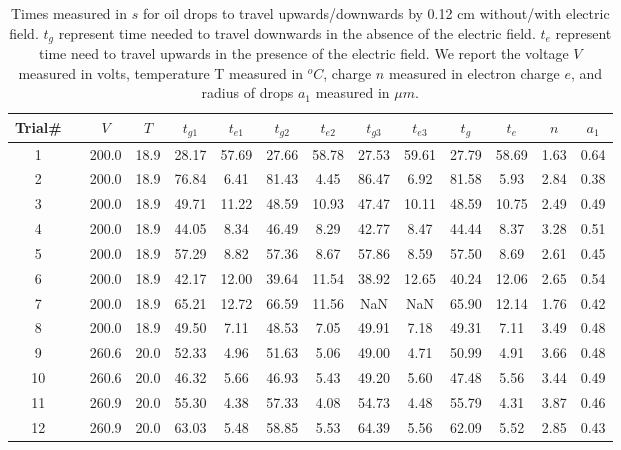 \documentclass{article}
\begin{document}
\begin{table}
\caption{Times measured in $s$ for oil drops to travel upwards/downwards by 0.12 cm without/with electric field. $t_g$ represent time needed to travel downwards in the absence of the electric field. $t_e$ represent time need to travel upwards in the presence of the electric field. We report the voltage $V$ measured in volts, temperature T measured in $^o C$, charge $n$ measured in electron charge $e$, and radius of drops $a_1$ measured in $\mu m$.
}
\vspace{2mm}
\centering %
\begin{tabular}{c c c c c c c c c c c c c c} %
\hline\hline %
Trial\# & \vline & $V$ & $T$ & $t_{g1}$ & $t_{e1}$ & $t_{g2}$ & $t_{e2}$ & $t_{g3}$ & $t_{e3}$ & $t_{g}$ & $t_{e}$ & $n$ & $a_1$\\ [0.5ex]
\hline %
1 & \vline & 200.0 & 18.9 & 28.17 & 57.69 & 27.66 & 58.78 & 27.53 & 59.61 & 27.79 & 58.69 & 1.63 & 0.64 \\
2 & \vline & 200.0 & 18.9 & 76.84 & 6.41 & 81.43 & 4.45 & 86.47 & 6.92 & 81.58 & 5.93 & 2.84 & 0.38 \\
3 & \vline & 200.0 & 18.9 & 49.71 & 11.22 & 48.59 & 10.93 & 47.47 & 10.11 & 48.59 & 10.75 & 2.49 & 0.49 \\
4 & \vline & 200.0 & 18.9 & 44.05 & 8.34 & 46.49 & 8.29 & 42.77 & 8.47 & 44.44 & 8.37 & 3.28 & 0.51 \\
5 & \vline & 200.0 & 18.9 & 57.29 & 8.82 & 57.36 & 8.67 & 57.86 & 8.59 & 57.50 & 8.69 & 2.61 & 0.45 \\
6 & \vline & 200.0 & 18.9 & 42.17 & 12.00 & 39.64 & 11.54 & 38.92 & 12.65 & 40.24 & 12.06 & 2.65 & 0.54 \\
7 & \vline & 200.0 & 18.9 & 65.21 & 12.72 & 66.59 & 11.56 & NaN & NaN & 65.90 & 12.14 & 1.76 & 0.42 \\
8 & \vline & 200.0 & 18.9 & 49.50 & 7.11 & 48.53 & 7.05 & 49.91 & 7.18 & 49.31 & 7.11 & 3.49 & 0.48 \\
9 & \vline & 260.6 & 20.0 & 52.33 & 4.96 & 51.63 & 5.06 & 49.00 & 4.71 & 50.99 & 4.91 & 3.66 & 0.48 \\
10 & \vline & 260.6 & 20.0 & 46.32 & 5.66 & 46.93 & 5.43 & 49.20 & 5.60 & 47.48 & 5.56 & 3.44 & 0.49 \\
11 & \vline & 260.9 & 20.0 & 55.30 & 4.38 & 57.33 & 4.08 & 54.73 & 4.48 & 55.79 & 4.31 & 3.87 & 0.46 \\
12 & \vline & 260.9 & 20.0 & 63.03 & 5.48 & 58.85 & 5.53 & 64.39 & 5.56 & 62.09 & 5.52 & 2.85 & 0.43 \\

\end{tabular}
\end{table}
\end{document}
